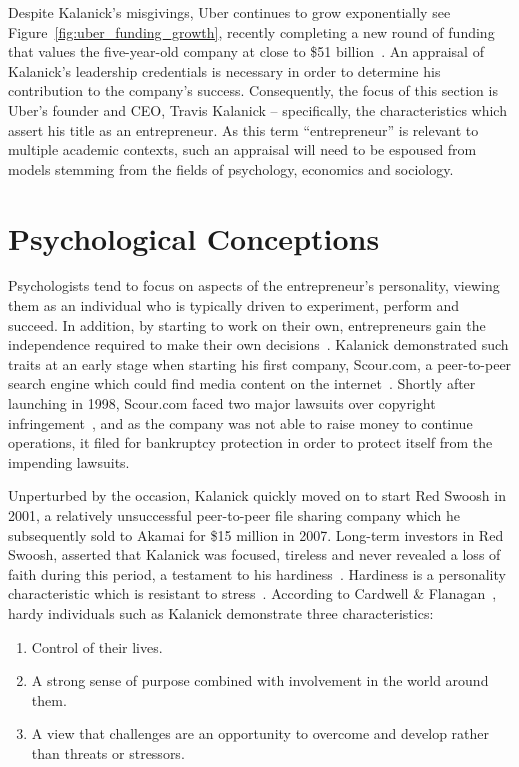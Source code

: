     Despite Kalanick's misgivings, Uber continues to grow exponentially see Figure~\ref{fig:uber_funding_growth}, recently completing a new round of funding that values the five-year-old company at close to \$51 billion~\parencite{macmillan2015}. An appraisal of Kalanick's leadership credentials is necessary in order to determine his contribution to the company's success. Consequently, the focus of this section is Uber's founder and CEO, Travis Kalanick -- specifically, the characteristics which assert his title as an entrepreneur. As this term ``entrepreneur'' is relevant to multiple academic contexts, such an appraisal will need to be espoused from models stemming from the fields of psychology, economics and sociology.

  \section{Psychological Conceptions}

    Psychologists tend to focus on aspects of the entrepreneur's personality, viewing them as an individual who is typically driven to experiment, perform and succeed. In addition, by starting to work on their own, entrepreneurs gain the independence required to make their own decisions~\parencite{groenewald2006}. Kalanick demonstrated such traits at an early stage when starting his first company, Scour.com, a peer-to-peer search engine which could find media content on the internet~\parencite{kessler2013}. Shortly after launching in 1998, Scour.com faced two major lawsuits over copyright infringement~\parencite{huffstutter2000}, and as the company was not able to raise money to continue operations, it filed for bankruptcy protection in order to protect itself from the impending lawsuits.

    Unperturbed by the occasion, Kalanick quickly moved on to start Red Swoosh in 2001, a relatively unsuccessful peer-to-peer file sharing company which he subsequently sold to Akamai for \$15 million in 2007. Long-term investors in Red Swoosh, asserted that Kalanick was focused, tireless and never revealed a loss of faith during this period, a testament to his hardiness~\parencite{mishkin2015}. Hardiness is a personality characteristic which is resistant to stress~\parencite{kobasa1979}. According to Cardwell \& Flanagan~\parencite{cardwell2008}, hardy individuals such as Kalanick demonstrate three characteristics:

    \begin{enumerate}
      \item Control of their lives.
      \item A strong sense of purpose combined with involvement in the world around them.
      \item A view that challenges are an opportunity to overcome and develop rather than threats or stressors.
    \end{enumerate}

